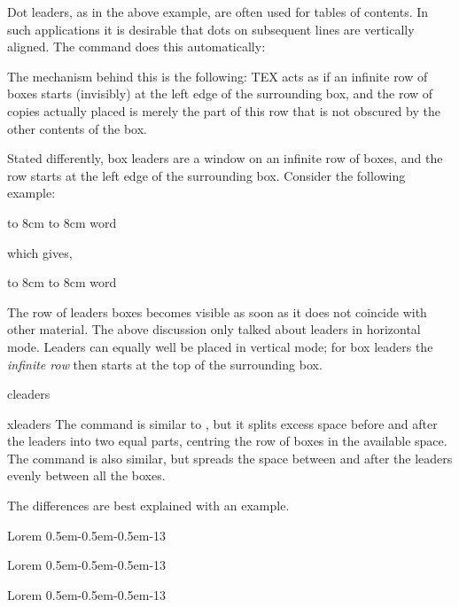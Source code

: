 Dot leaders, as in the above example, are often used for tables of contents. In such applications it
is desirable that dots on subsequent lines are vertically aligned. The command does this
automatically:


The mechanism behind this is the following: TEX acts as if an infinite row of boxes starts (invisibly)
at the left edge of the surrounding box, and the row of copies actually placed is merely the part of
this row that is not obscured by the other contents of the box.

Stated differently, box leaders are a window on an infinite row of boxes, and the row starts at the
left edge of the surrounding box. Consider the following example:

\begin{texexample}{}{}
\hbox to 8cm {\leaders\copy\centerdot\hfil}
\hbox to 8cm {word\leaders\copy\centerdot\hfil}
\end{texexample}

which gives,

\hbox to 8cm {\leaders\copy\centerdot\hfil}
\hbox to 8cm {word\leaders\copy\centerdot\hfil}

The row of leaders boxes becomes visible as soon as it does not coincide with other material.
The above discussion only talked about leaders in horizontal mode. Leaders can equally well be
placed in vertical mode; for box leaders the \textit{infinite row} then starts at the top of the surrounding
box.


\begin{docCommand}{cleaders}{}
\begin{docCommand}{xleaders}{}
The  command is similar to 
, but it splits excess space before and after the leaders into two equal parts, centring the row of boxes in the available space.
The  command is also similar, but spreads the space between and after the leaders evenly between all the boxes.
\end{docCommand}
\end{docCommand}

The differences are best explained with an example.

\begin{texexample}{}{}
\def\leaderpattern{\hbox{\kern0.5em-\kern0.5em-\kern0.5em-}}
Lorem \leaders\leaderpattern\hfill 13\par
Lorem \cleaders\leaderpattern\hfill 13\par
Lorem \xleaders\leaderpattern\hfill 13\par

\meaning\xleaders
\end{texexample}




